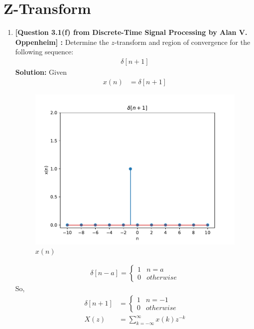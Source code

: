 \documentclass[journal,12pt,twocolumn]{IEEEtran}
\newcommand{\solution}{\noindent \textbf{Solution: }}
\providecommand{\sbrak}[1]{\ensuremath{\left[#1\right]}}
\numberwithin{equation}{section}
\begin{document}
 \section{Z-Transform}
\begin{enumerate}[label=\arabic*]
\item \textbf{[Question 3.1(f) from Discrete-Time Signal Processing by Alan V. Oppenheim] : }Determine the $z$-transform and region of convergence for the following sequence:
\begin{align}
\delta\sbrak{n+1}
\end{align}
\solution Given
\begin{align}
x(n)& = \delta\sbrak{n+1}
\end{align}
\begin{figure}[!ht]
\begin{center}
\includegraphics[width=\columnwidth]{./figs/unitsample}
\end{center}
\caption{$x(n)$}	
\end{figure}
\begin{align}
\delta\sbrak{n-a}=
\begin{cases}
1 & n=a\\
0 & otherwise
\end{cases}
\end{align}
So,
\begin{align}
\delta\sbrak{n+1}&=
\begin{cases}
1 & n=-1\\
0 & otherwise
\end{cases}\\
X(z) &= \sum_{k=-\infty}^{\infty}x(k)z^{-k}\\

\end{align}
\end{enumerate}
\end{document}
